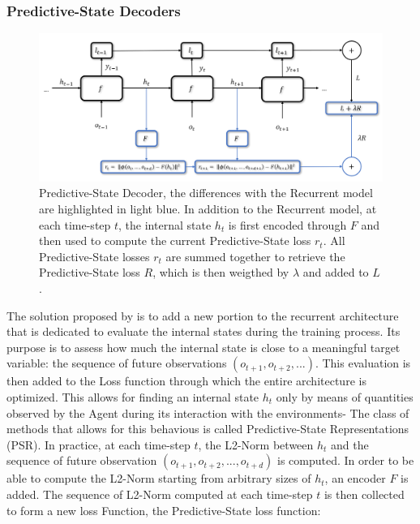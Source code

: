             \subsubsection{Predictive-State Decoders}
            
                \begin{figure}[t]
                    \centering
                    \includegraphics[width=15cm, keepaspectratio]{images/pomdp/pomdp_psd.png}
                    \caption{Predictive-State Decoder, the differences with the Recurrent model are highlighted in light blue. In addition to the Recurrent model, at each time-step $t$, the internal state $h_t$ is first encoded through $F$ and then used to compute the current Predictive-State loss $r_t$. All Predictive-State losses $r_t$ are summed together to retrieve the Predictive-State loss $R$, which is then weigthed by $\lambda$ and added to $L$.}
                    \label{fig:pomdp_psd}
                \end{figure}
            
                The solution proposed by  is to add a new portion to the recurrent architecture that is dedicated to evaluate the internal states during the training process. Its purpose is to assess how much the internal state is close to a meaningful target variable: the sequence of future observations $(o_{t+1}, o_{t+2}, ...)$. This evaluation is then added to the Loss function through which the entire architecture is optimized. This allows for finding an internal state $h_t$ only by means of quantities observed by the Agent during its interaction with the environments- The class of methods that allows for this behavious is called Predictive-State Representations (PSR). \newline
                In practice, at each time-step $t$, the L2-Norm between $h_t$ and the sequence of future observation $(o_{t+1}, o_{t+2}, ..., o_{t+d})$ is computed. In order to be able to compute the L2-Norm starting from arbitrary sizes of $h_t$, an encoder $F$ is added. The sequence of L2-Norm computed at each time-step $t$ is then collected to form a new loss Function, the Predictive-State loss function:
                
